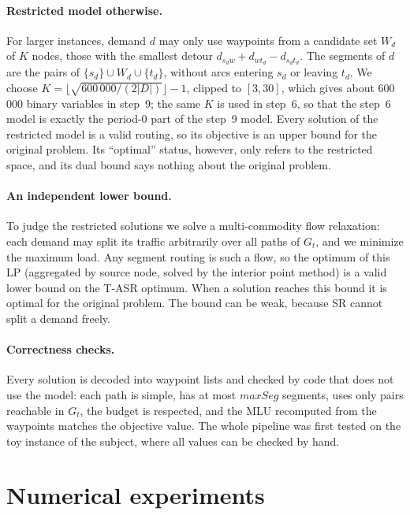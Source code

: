 \documentclass[11pt,a4paper]{article}
\newcommand{\maxseg}{\mathit{maxSeg}}
\begin{document}
\paragraph{Restricted model otherwise.}
For larger instances, demand $d$ may only use waypoints from a candidate set $W_d$ of $K$ nodes,
those with the smallest detour $d_{s_dw}+d_{wt_d}-d_{s_dt_d}$. The segments of $d$ are the pairs of
$\{s_d\}\cup W_d\cup\{t_d\}$, without arcs entering $s_d$ or leaving $t_d$. We choose
$K=\lfloor\sqrt{600\,000/(2|D|)}\rfloor-1$, clipped to $[3,30]$, which gives about 600\,000 binary
variables in step~9; the same $K$ is used in step~6, so that the step~6 model is exactly the
period-0 part of the step~9 model. Every solution of the restricted model is a valid routing, so its
objective is an upper bound for the original problem. Its ``optimal'' status, however, only refers
to the restricted space, and its dual bound says nothing about the original problem.

\paragraph{An independent lower bound.}
To judge the restricted solutions we solve a multi-commodity flow relaxation: each demand may split
its traffic arbitrarily over all paths of $G_t$, and we minimize the maximum load. Any segment
routing is such a flow, so the optimum of this LP (aggregated by source node, solved by the interior
point method) is a valid lower bound on the T-ASR optimum. When a solution reaches this bound it is
optimal for the original problem. The bound can be weak, because SR cannot split a demand freely.

\paragraph{Correctness checks.}
Every solution is decoded into waypoint lists and checked by code that does not use the model: each
path is simple, has at most $\maxseg$ segments, uses only pairs reachable in $G_t$, the budget is
respected, and the MLU recomputed from the waypoints matches the objective value. The whole pipeline
was first tested on the toy instance of the subject, where all values can be checked by hand.

\section{Numerical experiments}\label{sec:exp}
\end{document}
